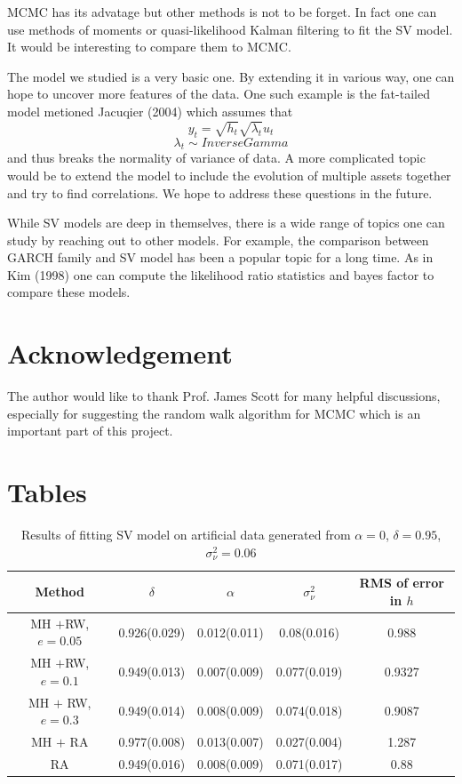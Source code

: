 \documentclass{article}
\begin{document}
MCMC has its advatage but other methods is not to be forget. In fact one can use methods of moments or quasi-likelihood Kalman filtering to fit the SV model. It would be interesting to compare them to MCMC.

The model we studied is a very basic one. By extending it in various way, one can hope to uncover more features of the data. One such example is the fat-tailed model metioned Jacuqier (2004) which assumes that
\[
y_t=\sqrt{h_t}\sqrt{\lambda_t}u_t
\]
\[
\lambda_t\sim Inverse Gamma
\]
and thus breaks the normality of variance of data. A more complicated topic would be to extend the model to include the evolution of multiple assets together and try to find correlations. We hope to address these questions in the future.

While SV models are deep in themselves, there is a wide range of topics one can study by reaching out to other models. For example, the comparison between GARCH family and SV model has been a popular topic for a long time. As in Kim (1998) one can compute the likelihood ratio statistics and bayes factor to compare these models.
\section{Acknowledgement}
The author would like to thank Prof. James Scott for many helpful discussions, especially for suggesting the random walk algorithm for MCMC which is an important part of this project.
\section{Tables}

\begin{table}[H]
\centering
\begin{tabular}{|c|c|c|c|c|}
\hline
Method& $\delta$ & $\alpha$& $\sigma_\nu^2$ & RMS of error in $h$ \\
\hline
MH $+$RW, $e=0.05$ & 0.926(0.029) & 0.012(0.011) &0.08(0.016)&0.988 \\
\hline
MH $+$RW,$e=0.1$& 0.949(0.013) & 0.007(0.009)  &0.077(0.019) &0.9327\\
\hline
MH $+$ RW, $e=0.3$ & 0.949(0.014) &  0.008(0.009) & 0.074(0.018) &0.9087\\
\hline
MH $+$ RA &  0.977(0.008) & 0.013(0.007) & 0.027(0.004) & 1.287\\
\hline
RA& 0.949(0.016) & 0.008(0.009) &0.071(0.017)& 0.88\\
\hline
\end{tabular}
\caption{Results of fitting SV model on artificial data generated from $\alpha=0$, $\delta=0.95$, $\sigma_\nu^2=0.06$}\label{11}
\end{table}
\end{document}
